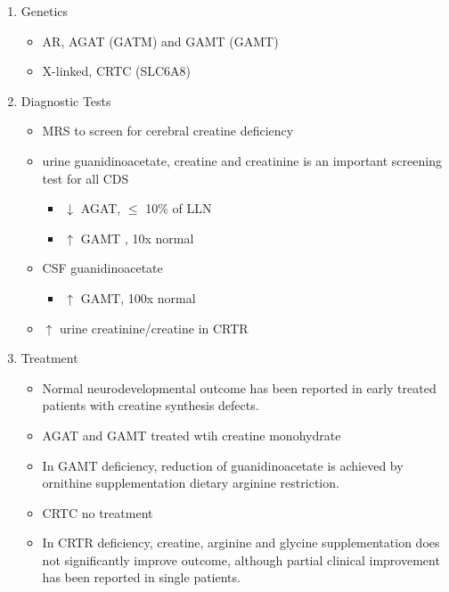\documentclass{scrartcl}
\begin{document}
\begin{enumerate}
\item Genetics
\label{sec:org9ea835e}
\begin{itemize}
\item AR, AGAT (GATM) and GAMT (GAMT)
\item X-linked, CRTC (SLC6A8)
\end{itemize}
\item Diagnostic Tests
\label{sec:orge8fd60c}
\begin{itemize}
\item MRS to screen for cerebral creatine deficiency
\item urine guanidinoacetate, creatine and creatinine is an important
screening test for all CDS
\begin{itemize}
\item \(\downarrow\) AGAT, \(\le\) 10\% of LLN
\item \(\uparrow\) GAMT , 10x normal
\end{itemize}
\item CSF guanidinoacetate
\begin{itemize}
\item \(\uparrow\) GAMT, 100x normal
\end{itemize}
\item \(\uparrow\) urine creatinine/creatine in CRTR
\end{itemize}

\item Treatment
\label{sec:orgfc19e87}
\begin{itemize}
\item Normal neurodevelopmental outcome has been reported in early treated
patients with creatine synthesis defects.
\item AGAT and GAMT treated wtih creatine monohydrate
\item In GAMT deficiency, reduction of guanidinoacetate is achieved by
ornithine supplementation \textpm{} dietary arginine restriction.
\item CRTC no treatment
\item In CRTR deficiency, creatine, arginine and glycine supplementation
does not significantly improve outcome, although partial clinical
improvement has been reported in single patients.
\end{itemize}
\end{enumerate}
\end{document}
